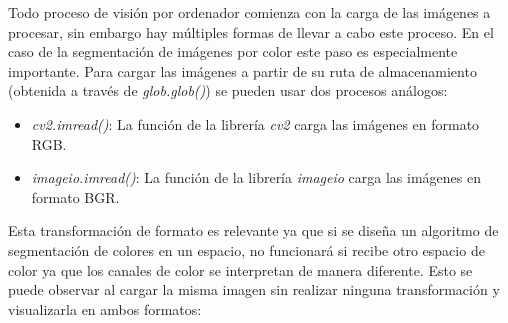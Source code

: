 \documentclass[a4paper,12pt]{article}
\begin{document}
{\vspace{0.5cm}

Todo proceso de visión por ordenador comienza con la carga de las imágenes a procesar, sin embargo hay múltiples formas de llevar 
a cabo este proceso. En el caso de la segmentación de imágenes por color este paso es especialmente importante. Para cargar las imágenes
a partir de su ruta de almacenamiento (obtenida a través de \textit{glob.glob()}) se pueden usar dos procesos análogos:

\vspace{0.5cm}

\begin{itemize}
  \item \textit{cv2.imread()}: La función de la librería \textit{cv2} carga las imágenes en formato RGB.

  \item \textit{imageio.imread()}: La función de la librería \textit{imageio} carga las imágenes en formato BGR.
\end{itemize}

\vspace{0.5cm}

Esta transformación de formato es relevante ya que si se diseña un algoritmo de segmentación de colores en un espacio, no funcionará 
si recibe otro espacio de color ya que los canales de color se interpretan de manera diferente. Esto se puede observar al cargar 
la misma imagen sin realizar ninguna transformación y visualizarla en ambos formatos:

\vspace{0.5cm}

}
\end{document}
